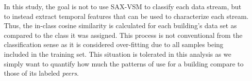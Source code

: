 In this study, the goal is not to use SAX-VSM to classify each data stream, but to instead extract temporal features that can be used to characterize each stream. Thus, the in-class cosine similarity is calculated for each building's data set as compared to the class it was assigned. This process is not conventional from the classification sense as it is considered over-fitting due to all samples being included in the training set. This situation is tolerated in this analysis as we simply want to quantify how much the patterns of use for a building compare to those of its labeled \emph{peers}.